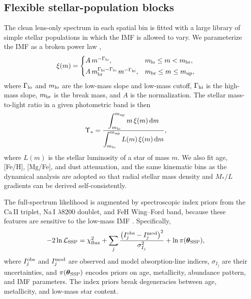 \documentclass{article}
\begin{document}
\subsection{Flexible stellar-population blocks}
The clean lens-only spectrum in each spatial bin is fitted with a large library of simple stellar populations in which the IMF is allowed to vary. We parameterize the IMF as a broken power law \cite{vanDokkum2023JWSTER1, Conroy2013},
\begin{equation}
\xi(m) =
\begin{cases}
A\, m^{-\Gamma_{\rm lo}}, & m_{\rm lo} \le m < m_{\rm br},\\[2pt]
A\, m_{\rm br}^{\Gamma_{\rm hi} - \Gamma_{\rm lo}}\, m^{-\Gamma_{\rm hi}}, & m_{\rm br} \le m \le m_{\rm up},
\end{cases}
\label{eq:imf}
\end{equation}
where \(\Gamma_{\rm lo}\) and \(m_{\rm lo}\) are the low-mass slope and low-mass cutoff, \(\Gamma_{\rm hi}\) is the high-mass slope, \(m_{\rm br}\) is the break mass, and \(A\) is the normalization. The stellar mass-to-light ratio in a given photometric band is then
\begin{equation}
\Upsilon_* =
\frac{\displaystyle\int_{m_{\rm lo}}^{m_{\rm up}} m\, \xi(m)\, {\rm d}m}
{\displaystyle\int_{m_{\rm lo}}^{m_{\rm up}} L(m)\, \xi(m)\, {\rm d}m},
\label{eq:ml}
\end{equation}
where \(L(m)\) is the stellar luminosity of a star of mass \(m\). We also fit age, [Fe/H], [Mg/Fe], and dust attenuation, and the same kinematic bins as the dynamical analysis are adopted so that radial stellar mass density and \(M_*/L\) gradients can be derived self-consistently.

The full-spectrum likelihood is augmented by spectroscopic index priors from the Ca\,II triplet, Na\,I \(\lambda 8200\) doublet, and FeH Wing--Ford band, because these features are sensitive to the low-mass IMF \cite{Conroy2013}. Specifically,
\begin{equation}
-2\ln \mathcal{L}_{\rm SSP} =
\chi^2_{\rm flux}
+ \sum_{j} \frac{\left(I_j^{\rm obs} - I_j^{\rm mod}\right)^2}{\sigma_{I_j}^2}
+ \ln \pi(\boldsymbol{\theta}_{\rm SSP}),
\label{eq:ssp_likelihood}
\end{equation}
where \(I_j^{\rm obs}\) and \(I_j^{\rm mod}\) are observed and model absorption-line indices, \(\sigma_{I_j}\) are their uncertainties, and \(\pi(\boldsymbol{\theta}_{\rm SSP})\) encodes priors on age, metallicity, abundance pattern, and IMF parameters. The index priors break degeneracies between age, metallicity, and low-mass star content.
\end{document}
